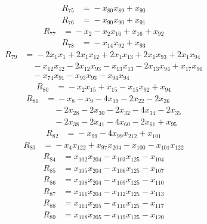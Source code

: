 \begin{align*}
R_{75}&={}-x_{80}x_{89} +x_{90}
\end{align*}
\begin{align*}
R_{76}&={}-x_{90}x_{90} +x_{91}
\end{align*}
\begin{align*}
R_{77}&={}-x_{2} -x_{2}x_{16} +x_{16} +x_{92}
\end{align*}
\begin{align*}
R_{78}&={}-x_{14}x_{92} +x_{93}
\end{align*}
\begin{align*}
R_{79}&={}-2x_{1}x_{1} +2x_{1}x_{12} +2x_{1}x_{13} +2x_{1}x_{93} +2x_{1}x_{94}\\
&\quad{}-x_{12}x_{12} -2x_{12}x_{93} -x_{13}x_{13} -2x_{13}x_{94} +x_{17}x_{96}\\
&\quad{}-x_{74}x_{91} -x_{93}x_{93} -x_{94}x_{94}
\end{align*}
\begin{align*}
R_{80}&={}-x_{2}x_{15} +x_{15} -x_{15}x_{92} +x_{94}
\end{align*}
\begin{align*}
R_{81}&={}-x_{8} -x_{9} -4x_{19} -2x_{22} -2x_{26}\\
&\quad{}-2x_{28} -2x_{30} -2x_{32} -4x_{34} -2x_{35}\\
&\quad{}-2x_{38} -2x_{41} -4x_{60} -2x_{61} +x_{95}
\end{align*}
\begin{align*}
R_{82}&={}-x_{99} -4x_{99}x_{212} +x_{101}
\end{align*}
\begin{align*}
R_{83}&={}-x_{4}x_{122} +x_{97}x_{204} -x_{100} -x_{101}x_{122}
\end{align*}
\begin{align*}
R_{84}&={}x_{102}x_{204} -x_{103}x_{125} -x_{104}
\end{align*}
\begin{align*}
R_{85}&={}x_{105}x_{204} -x_{106}x_{125} -x_{107}
\end{align*}
\begin{align*}
R_{86}&={}x_{108}x_{204} -x_{109}x_{125} -x_{110}
\end{align*}
\begin{align*}
R_{87}&={}x_{111}x_{204} -x_{112}x_{125} -x_{113}
\end{align*}
\begin{align*}
R_{88}&={}x_{114}x_{205} -x_{116}x_{125} -x_{117}
\end{align*}
\begin{align*}
R_{89}&={}x_{118}x_{205} -x_{119}x_{125} -x_{120}
\end{align*}
